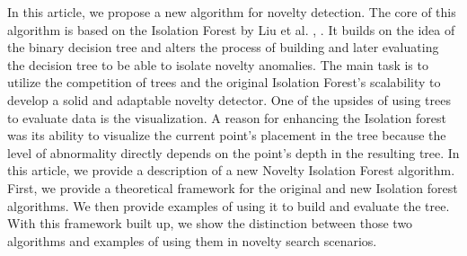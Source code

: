 In this article, we propose a new algorithm for novelty detection.
The core of this algorithm is based on the Isolation Forest by Liu et al. \cite{liu2008isolation}, \cite{liu2012isolation}.
It builds on the idea of the binary decision tree and alters the process of building and later evaluating the decision tree to be able to isolate novelty anomalies.
The main task is to utilize the competition of trees and the original Isolation Forest's scalability to develop a solid and adaptable novelty detector. One of the upsides of using trees to evaluate data is the visualization. A reason for enhancing the Isolation forest was its ability to visualize the current point's placement in the tree because the level of abnormality directly depends on the point's depth in the resulting tree.
In this article, we provide a description of a new Novelty Isolation Forest algorithm.
First, we provide a theoretical framework for the original and new Isolation forest algorithms.
We then provide examples of using it to build and evaluate the tree.
With this framework built up, we show the distinction between those two algorithms and examples of using them in novelty search scenarios.


